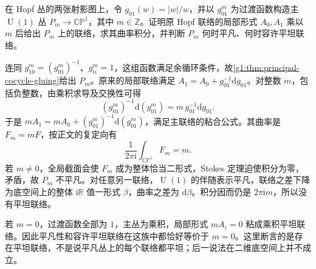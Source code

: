 \begin{exercise}\label{g1:ex:hopf-powers-flat-obstruction}
	在 Hopf 丛的两张射影图上，令 \(g_{01}(w)=|w|/w\)，并以 \(g_{01}^m\) 为过渡函数构造主 \(\operatorname{U}(1)\) 丛 \(P_m\to\mathbb{CP}^1\)，其中 \(m\in\mathbb Z\)。证明原 Hopf 联络的局部形式 \(A_0,A_1\) 乘以 \(m\) 后给出 \(P_m\) 上的联络，求其曲率积分，并判断 \(P_m\) 何时平凡、何时容许平坦联络。
\end{exercise}
\begin{solution}
	连同 \(g_{10}^m=(g_{01}^m)^{-1}\)、\(g_{ii}^m=1\)，这组函数满足余循环条件，故\cref{g1:thm:principal-cocycle-gluing}给出 \(P_m\)。原来的局部联络满足 \(A_1=A_0+g_{01}^{-1}\mathrm{d}g_{01}\)。对整数 \(m\)，包括负整数，由乘积求导及交换性可得
	\[
		(g_{01}^m)^{-1}\mathrm{d}(g_{01}^m)
		=m\,g_{01}^{-1}\mathrm{d}g_{01}.
	\]
	于是 \(mA_1=mA_0+(g_{01}^m)^{-1}\mathrm{d}(g_{01}^m)\)，满足主联络的粘合公式。其曲率是 \(F_m=mF\)，按正文的复定向有
	\[
		\frac1{2\pi\mathrm{i}}\int_{\mathbb{CP}^1}F_m=m.
	\]
	若 \(m\ne0\)，全局截面会使 \(F_m\) 成为整体恰当二形式，Stokes 定理迫使积分为零，矛盾，故 \(P_m\) 不平凡。对任意另一联络，\(\operatorname{U}(1)\) 的伴随表示平凡，联络之差下降为底空间上的整体 \(\mathrm{i}\mathbb R\) 值一形式 \(\beta\)，曲率之差为 \(\mathrm{d}\beta\)。积分因而仍是 \(2\pi\mathrm{i}m\)，所以没有平坦联络。

	若 \(m=0\)，过渡函数全部为 \(1\)，主丛为乘积，局部形式 \(mA_i=0\) 粘成乘积平坦联络。因此平凡性和容许平坦联络在这族中都恰好等价于 \(m=0\)。这里断言的是存在平坦联络，不是说平凡丛上的每个联络都平坦；后一说法在二维底空间上并不成立。
\end{solution}
